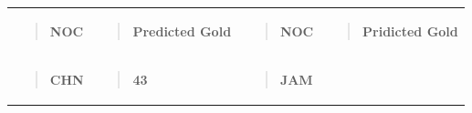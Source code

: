 \documentclass[12pt,a4paper]{article}
\renewenvironment{quote}{\begin{quotation}}{\end{quotation}}  %
\begin{document}
    \begin{longtable}[]{@{}
      >{\raggedright\arraybackslash}p{}
      >{\raggedright\arraybackslash}p{}
      >{\raggedright\arraybackslash}p{}
      >{\raggedright\arraybackslash}p{}@{}}
    \toprule\noalign{}
    \endhead
    \bottomrule\noalign{}
    \endlastfoot
    \begin{minipage}[t]{\linewidth}\raggedright
    \begin{quote}
    \textbf{NOC}
    \end{quote}
    \end{minipage} & \begin{minipage}[t]{\linewidth}\raggedright
    \begin{quote}
    \textbf{Predicted Gold}
    \end{quote}
    \end{minipage} & \begin{minipage}[t]{\linewidth}\raggedright
    \begin{quote}
    \textbf{NOC}
    \end{quote}
    \end{minipage} & \begin{minipage}[t]{\linewidth}\raggedright
    \begin{quote}
    \textbf{Pridicted Gold}
    \end{quote}
    \end{minipage} \\
    \begin{minipage}[t]{\linewidth}\raggedright
    \begin{quote}
    \textbf{CHN}
    \end{quote}
    \end{minipage} & \begin{minipage}[t]{\linewidth}\raggedright
    \begin{quote}
    \textbf{43}
    \end{quote}
    \end{minipage} & \begin{minipage}[t]{\linewidth}\raggedright
    \begin{quote}
    \textbf{JAM}
    \end{quote}
    \end{minipage} & \begin{minipage}[t]{\linewidth}\raggedright
    \begin{quote}

\end{quote}
\end{minipage}
\end{longtable}
\end{document}

